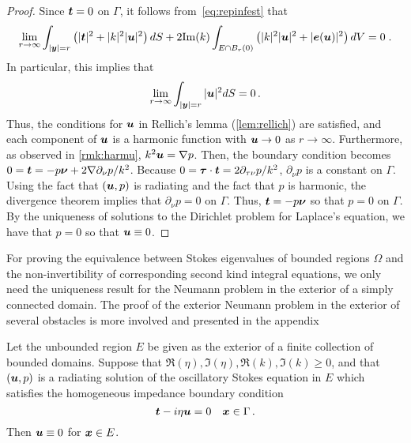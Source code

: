 \begin{proof}
Since ${\boldsymbol t} = 0$ on $\Gamma$, it follows
from~\cref{eq:repinfest} that
\begin{equation}
\lim_{r\to\infty}
\int_{|{\boldsymbol y}|=r} \left( |{\boldsymbol t}|^2 + |k|^2 |{\boldsymbol u}|^2 \right) dS +
2 {\textrm{\textup{Im}}}(k) \int_{E \cap B_{r}(0)} \left(|k|^2 |{\boldsymbol u}|^2 + |{\boldsymbol e}({\boldsymbol u})|^2 \right)
dV = 0 \; . \nonumber
\end{equation} 
In particular, this implies that
\begin{equation}
\lim_{r\to\infty} \int_{|{\boldsymbol y}|=r} |{\boldsymbol u}|^2 dS = 0 \, . \nonumber
\end{equation}
Thus, the conditions for ${\boldsymbol u}$ in Rellich's lemma (\cref{lem:rellich})
are satisfied, and each component of ${\boldsymbol u}$ is a harmonic function
with ${\boldsymbol u} \to 0$ as $r \to \infty$. Furthermore, as observed
in \cref{rmk:harmu}, $k^2 {\boldsymbol u} = \nabla p$. Then, the boundary
condition becomes $0 = {\boldsymbol t} = -p {\boldsymbol \nu} + 2 \nabla \partial_\nu p/k^2$.
Because $0 = {\boldsymbol \tau} \cdot {\boldsymbol t} = 2\partial_{\tau\nu} p/k^2$,
$\partial_\nu p $ is a constant on $\Gamma$. Using the
fact that $({\boldsymbol u},p)$ is radiating and the fact that $p$ is harmonic,
the divergence theorem implies that $\partial_\nu p=0$ on $\Gamma$.
Thus, ${\boldsymbol t} = -p{\boldsymbol \nu}$ so that $p = 0$ on $\Gamma$. By the uniqueness
of solutions to the Dirichlet problem for Laplace's equation,
we have that $p=0$ so that ${\boldsymbol u} \equiv 0$.
\end{proof}

\begin{remark}
For proving the equivalence between Stokes eigenvalues
of bounded regions $\Omega$ and the non-invertibility
of corresponding second kind integral equations, we only
need the uniqueness result for the Neumann problem in the 
exterior of a simply connected domain. 
The proof of the exterior Neumann problem in the exterior of several
obstacles is more involved and presented in the appendix~\cite{app:neuuniqueness}
\end{remark}

\begin{thrm}
  Let the unbounded region $E$ be given as the exterior
  of a finite collection of bounded domains.
  Suppose that $\Re(\eta),\Im(\eta),\Re(k),\Im(k) \geq 0$, and that
  $({\boldsymbol u},p)$ is a radiating solution of the
  oscillatory Stokes equation in $E$ which satisfies
  the homogeneous impedance boundary condition
  \begin{equation}
{\boldsymbol t} - i \eta {\boldsymbol u} = 0 \quad {\boldsymbol x} \in \Gamma \, . \nonumber
\end{equation}
Then ${\boldsymbol u} \equiv 0$ for ${\boldsymbol x} \in E$.
\end{thrm}

